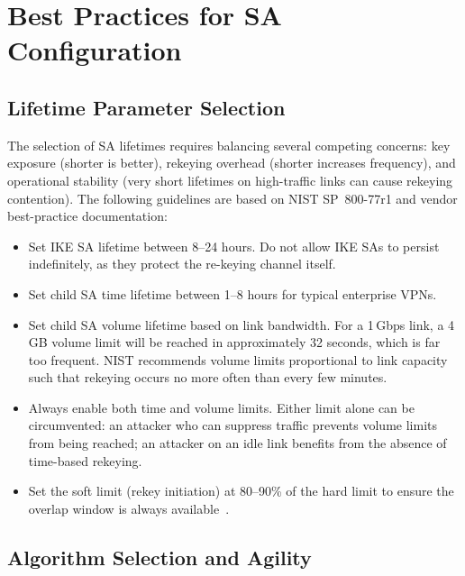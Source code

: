 \documentclass[sigconf,nonacm]{acmart}
\begin{document}
\section{Best Practices for SA Configuration}
\label{sec:bestpractices}

\subsection{Lifetime Parameter Selection}

The selection of SA lifetimes requires balancing several competing concerns:
key exposure (shorter is better), rekeying overhead (shorter increases frequency),
and operational stability (very short lifetimes on high-traffic links can cause
rekeying contention). The following guidelines are based on NIST SP~800-77r1 and
vendor best-practice documentation:

\begin{itemize}
  \item Set IKE SA lifetime between 8--24 hours. Do not allow IKE SAs to persist
        indefinitely, as they protect the re-keying channel itself.
  \item Set child SA time lifetime between 1--8 hours for typical enterprise VPNs.
  \item Set child SA volume lifetime based on link bandwidth. For a 1\,Gbps link,
        a 4\,GB volume limit will be reached in approximately 32 seconds, which is
        far too frequent. NIST recommends volume limits proportional to link capacity
        such that rekeying occurs no more often than every few minutes.
  \item Always enable both time and volume limits. Either limit alone can be
        circumvented: an attacker who can suppress traffic prevents volume limits from
        being reached; an attacker on an idle link benefits from the absence of
        time-based rekeying.
  \item Set the soft limit (rekey initiation) at 80--90\% of the hard limit to ensure
        the overlap window is always available~\cite{nist80077}.
\end{itemize}

\subsection{Algorithm Selection and Agility}
\end{document}
